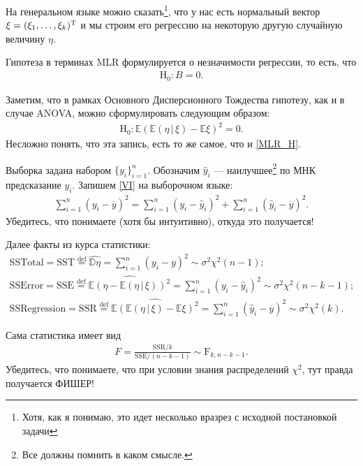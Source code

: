 На генеральном языке можно сказать\footnote{Хотя, как я понимаю, это идет несколько вразрез с исходной постановкой задачи},
что у нас есть нормальный вектор $\xi = (\xi_1, \ldots, \xi_k)^{\mathrm{T}}$ и мы строим его регрессию на некоторую другую случайную величину $\eta$.

Гипотеза в терминах MLR формулируется о незначимости регрессии, то есть, что
\begin{gather}
    \label{MLR_H}
    \mathrm H_0: B = 0.
\end{gather}

Заметим, что в рамках Основного Дисперсионного Тождества гипотезу, как и в случае ANOVA, можно сформулировать следующим образом:
\begin{gather}
    \label{MLR_VI_H}
    \mathrm H_0: \mathbb E(\mathbb E(\eta\, | \, \xi) - \mathbb E \xi)^2 = 0.
\end{gather}
Несложно понять, что эта запись, есть то же самое, что и \eqref{MLR_H}.

Выборка задана набором $\{y_i\}_{i=1}^n$. Обозначим $\hat y_i$ --- наилучшее\footnote{Все должны помнить в каком смысле.} по МНК предсказание $y_i$.
Запишем \eqref{VI} на выборочном языке:
\begin{gather}
    \label{VI_ANOVA}
    \sum_{i=1}^n (y_i - \overline y)^2 = \sum_{i=1}^n (y_{i} - \hat y_i)^2 + \sum_{i=1}^n (\hat y_i - \overline y)^2.
\end{gather}
Убедитесь, что понимаете (хотя бы интуитивно), откуда это получается!

Далее факты из курса статистики:
\begin{gather*}
    \mathrm {SS Total} = \mathrm {SST} \overset{\mathrm{def}}{=} \widehat{\mathbb D \eta} = \sum_{i=1}^n (y_i - \overline y)^2 \sim \mathcal \sigma^2 \chi^2 (n - 1);\\
    \mathrm {SS Error} = \mathrm {SSE} \overset{\mathrm{def}}{=} \widehat{\mathbb E(\eta - \mathbb E(\eta\, | \, \xi))^2} = \sum_{i=1}^n (y_{i} - \hat y_i)^2 \sim \sigma^2 \mathcal \chi^2 (n - k - 1);\\
    \mathrm {SS Regression} = \mathrm {SSR} \overset{\mathrm{def}}{=} \widehat{\mathbb E(\mathbb E(\eta\, | \, \xi) - \mathbb E \xi)^2} = \sum_{i=1}^n (\hat y_i - \overline y)^2 \sim \sigma^2 \mathcal \chi^2 (k).
\end{gather*}

Сама статистика имеет вид
\begin{gather*}
    F = \frac{\mathrm{SSR} / k}{\mathrm{SSE} / (n - k - 1)} \sim \mathrm F_{k,n-k-1}.
\end{gather*}
Убедитесь, что понимаете, что при условии знания распределений $\chi^2$, тут правда получается ФИШЕР!


